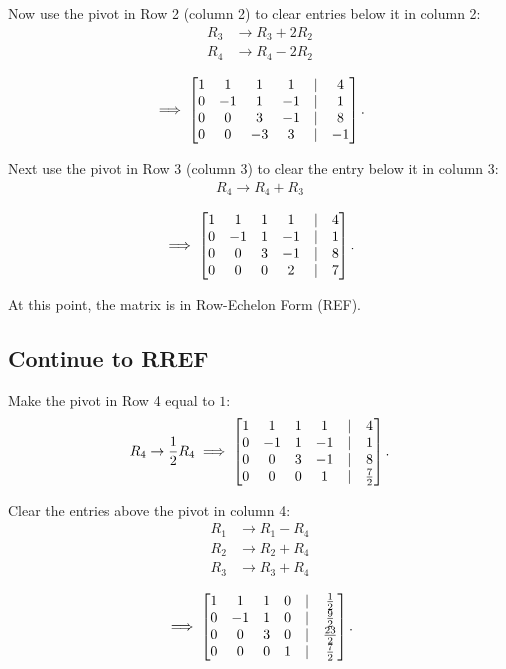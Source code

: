 Now use the pivot in Row 2 (column 2) to clear entries below it in column 2:
\begin{align*}
R_3 &\rightarrow R_3 + 2R_2 \\
R_4 &\rightarrow R_4 - 2R_2
\end{align*}

\begin{align*}
\implies
\begin{bmatrix} 
1 & 1 & 1 & 1 & \vert & 4\\
0 & -1 & 1 & -1 & \vert & 1\\
0 & 0 & 3 & -1 & \vert & 8\\
0 & 0 & -3 & 3 & \vert & -1
 \end{bmatrix}.
\end{align*}

Next use the pivot in Row 3 (column 3) to clear the entry below it in column 3:
\begin{align*}
R_4 \rightarrow R_4 + R_3
\end{align*}

\begin{align*}
\implies
\begin{bmatrix} 
1 & 1 & 1 & 1 & \vert & 4\\
0 & -1 & 1 & -1 & \vert & 1\\
0 & 0 & 3 & -1 & \vert & 8\\
0 & 0 & 0 & 2 & \vert & 7
 \end{bmatrix}.
\end{align*}

At this point, the matrix is in Row-Echelon Form (REF).

\subsection{Continue to RREF}

Make the pivot in Row 4 equal to $1$:
\begin{align*}
R_4 \rightarrow \frac{1}{2}R_4
\implies
\begin{bmatrix} 
1 & 1 & 1 & 1 & \vert & 4\\
0 & -1 & 1 & -1 & \vert & 1\\
0 & 0 & 3 & -1 & \vert & 8\\
0 & 0 & 0 & 1 & \vert & \frac{7}{2}
 \end{bmatrix}.
\end{align*}

Clear the entries above the pivot in column 4:
\begin{align*}
R_1 &\rightarrow R_1 - R_4\\
R_2 &\rightarrow R_2 + R_4\\
R_3 &\rightarrow R_3 + R_4
\end{align*}

\begin{align*}
\implies
\begin{bmatrix} 
1 & 1 & 1 & 0 & \vert & \frac{1}{2}\\
0 & -1 & 1 & 0 & \vert & \frac{9}{2}\\
0 & 0 & 3 & 0 & \vert & \frac{23}{2}\\
0 & 0 & 0 & 1 & \vert & \frac{7}{2}
 \end{bmatrix}.
\end{align*}

